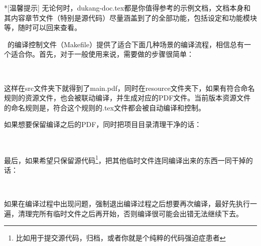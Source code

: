 \begin{dkcomment}*[温馨提示]
  无论何时，dukang-doc.tex都是你值得参考的示例文档，文档本身和其内容章节文件（特别是源代码）尽量涵盖到了{\dk}的全部功能，包括设定和功能模块等，随时可以回来查看。\faKissWinkHeart
\end{dkcomment}

\dk~的编译控制文件（Makefile）提供了适合下面几种场景的编译流程，相信总有一个适合你。首先，对于一般使用来说，需要做的步骤很简单：

\begin{center}
  ~\faArrowCircleRight~~\faArrowCircleRight~~\faCheckCircle
\end{center}

这样在src文件夹下就得到了main.pdf，同时在resource文件夹下，如果有符合命名规则的资源文件，也会被联动编译，并生成对应的PDF文件。{\dk}当前版本资源文件的命名规则是，符合这个规则的.tex文件都会被自动编译和控制。

如果想要保留编译之后的PDF，同时把项目目录清理干净的话：

\begin{center}
  ~\faArrowCircleRight~~\faArrowCircleRight~~\faArrowCircleRight~~\faCheckCircle
\end{center}

最后，如果希望只保留源代码\footnote{比如用于提交源代码，归档，或者你就是个纯粹的代码强迫症患者{\color{awesome}\faHeart}}，把其他临时文件连同编译出来的东西一同干掉的话：

\begin{center}
  ~\faArrowCircleRight~~\faArrowCircleRight~~\faArrowCircleRight~~\faCheckCircle
\end{center}

\begin{dkcomment}
  如果在编译过程中出现问题，强制退出编译过程之后想要再次编译，最好先执行一遍，清理完所有临时文件之后再开始，否则编译很可能会出错无法继续下去。
\end{dkcomment}


\clearpage
